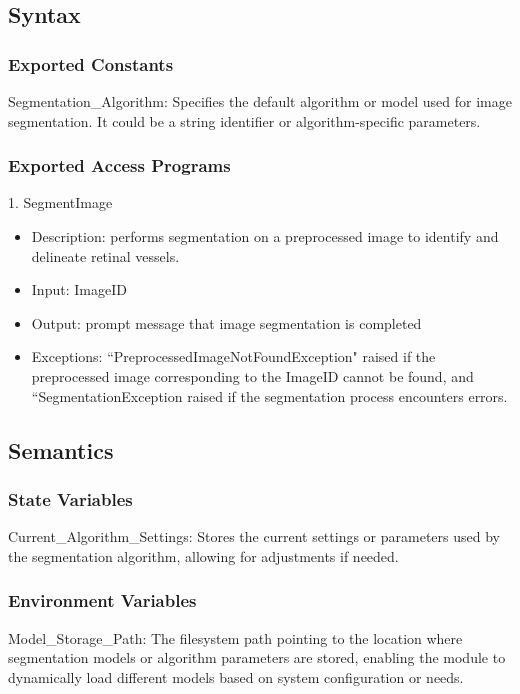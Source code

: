 \documentclass[12pt, titlepage]{article}
\begin{document}
\begin{itemize}
\subsection{Syntax}

\subsubsection{Exported Constants}
Segmentation\_Algorithm: Specifies the default algorithm or model used for image segmentation. It could be a string identifier or algorithm-specific parameters.

\subsubsection{Exported Access Programs}
1. SegmentImage
\begin{itemize}
    \item Description: performs segmentation on a preprocessed image to identify and delineate retinal vessels.
    \item Input: ImageID
    \item Output: prompt message that image segmentation is completed 
    \item Exceptions: ``PreprocessedImageNotFoundException" raised if the preprocessed image corresponding to the ImageID cannot be found, and ``SegmentationException raised if the segmentation process encounters errors.
\end{itemize}


\subsection{Semantics}
\subsubsection{State Variables}
Current\_Algorithm\_Settings: Stores the current settings or parameters used by the segmentation algorithm, allowing for adjustments if needed.

\subsubsection{Environment Variables}

Model\_Storage\_Path: The filesystem path pointing to the location where segmentation models or algorithm parameters are stored, enabling the module to dynamically load different models based on system configuration or needs.


\end{itemize}
\end{document}
